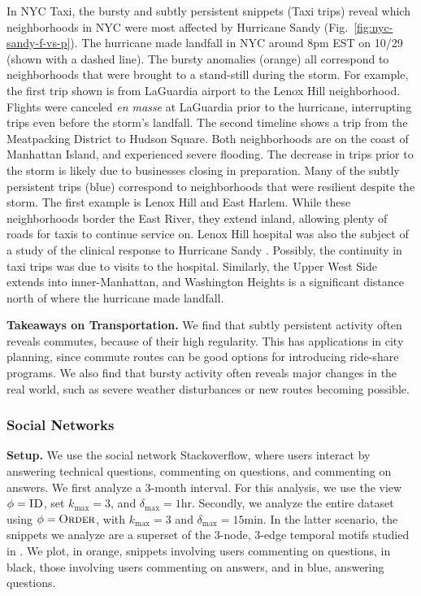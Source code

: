 \documentclass[sigconf]{acmart}
\newcommand{\patternSize}{k}
\newcommand{\duration}{\delta}
\newcommand{\view}{\phi}
\newcommand{\idView}{\textsc{ID}\xspace}
\newcommand{\orderView}{\textsc{Order}\xspace}
\newcommand{\maxDuration}{\duration_{\max}}
\newcommand{\maxSize}{\patternSize_{\max}}
\newcommand{\stackoverflow}{Stackoverflow\xspace}
\newcommand{\NYC}{NYC Taxi\xspace}
\begin{document}
In \NYC, the bursty and subtly persistent snippets (Taxi trips) reveal which neighborhoods in NYC were most affected by Hurricane Sandy (Fig.~\ref{fig:nyc-sandy-f-vs-p}). The hurricane made landfall in NYC around 8pm EST on 10/29 (shown with a dashed line). The bursty anomalies (orange) all correspond to neighborhoods that were brought to a stand-still during the storm. For example, the first trip shown is from LaGuardia airport to the Lenox Hill neighborhood. Flights were canceled \emph{en masse} at LaGuardia prior to the hurricane, interrupting trips even 
before the storm's landfall. The second timeline shows a trip from the Meatpacking District to Hudson Square. Both neighborhoods are on the coast of Manhattan Island, and experienced severe flooding. The decrease in trips prior to the storm is likely due to businesses closing in preparation. Many of the subtly persistent trips (blue) correspond to neighborhoods that were resilient despite the storm. The first example is Lenox Hill and East Harlem. While these neighborhoods border the East River, they extend inland, allowing plenty of roads for taxis to continue service on. Lenox Hill hospital was also the subject of a study of the clinical response to Hurricane Sandy \cite{walczyszyn2019battling}. Possibly, the continuity in taxi trips was due to visits to the hospital. Similarly, the Upper West Side extends into inner-Manhattan, and Washington Heights is a significant distance north of where the hurricane made landfall.

\textbf{Takeaways on Transportation.} We find that subtly persistent activity often reveals commutes, because of their high regularity. This has applications in city planning, since commute routes can be good options for introducing ride-share programs. We also find that bursty activity often reveals major changes in the real world, such as severe weather disturbances or new routes becoming possible.

\subsubsection{Social Networks}
\label{subsubsec:social-networks}

\textbf{Setup.} We use the social network \stackoverflow, where users interact by answering technical questions, commenting on questions, and commenting on answers. We first analyze a 3-month interval. For this analysis, we use the view $\view = \idView$, set $\maxSize = 3$, and $\maxDuration = 1$hr. Secondly, we analyze the entire dataset using $\view = \orderView$, with $\maxSize = 3$ and $\maxDuration = 15$min. In the latter scenario, the snippets we analyze are a superset of the 3-node, 3-edge temporal motifs studied in \cite{paranjape2017motifs}. We plot, in orange, snippets involving users commenting on questions, in black, those involving users commenting on answers, and in blue, answering questions. 
\end{document}
